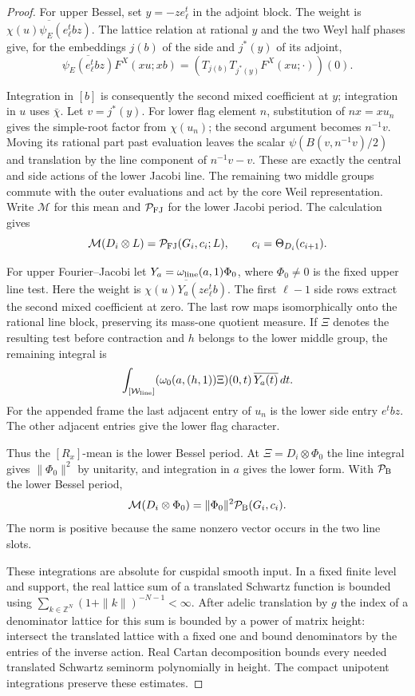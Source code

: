 \begin{proof}
For upper Bessel, set \(y=-ze_\ell^t\) in the adjoint block.
The weight is \(\overline{\chi(u)\psi_E(e_\ell^t b z)}\).
The lattice relation at rational \(y\) and the two Weyl half phases
give, for the embeddings \(j(b)\) of the side and \(j^*(y)\) of
its adjoint,
\[
 \overline{\psi_E(e_\ell^t b z)}F^X(xu;xb)
      =(T_{j(b)}T_{j^*(y)}F^X(xu;\cdot))(0).
\]

Integration in \([b]\) is consequently the second mixed coefficient
at \(y\); integration in \(u\) uses \(\bar\chi\). Let \(v=j^*(y)\).
For lower flag element \(n\), substitution of \(nx=xu_n\) gives
the simple-root factor from \(\chi(u_n)\); the second argument becomes
\(n^{-1}v\). Moving its rational part past evaluation leaves the
scalar \(\psi(B(v,n^{-1}v)/2)\) and translation by the line component
of \(n^{-1}v-v\). These are exactly the central and side actions
of the lower Jacobi line. The remaining two middle groups commute
with the outer evaluations and act by the core Weil representation.
Write \(\mathcal M\) for this mean and \(\mathcal P_{\rm FJ}\) for the lower Jacobi period. The calculation gives
\[
 \mathcal M(D_i\otimes L)=\mathcal P_{\rm FJ}(G_i,c_i;L),\qquad c_i=\Theta_{D_i}(c_{i+1}).
\]



For upper Fourier--Jacobi let \(Y_a=\omega_{\rm line}(a,1)\Phi_0\),
where \(\Phi_0\ne0\) is the fixed upper line test. Here the weight
is \(\overline{\chi(u)Y_a(ze_\ell^t b)}\). The first \(\ell-1\)
side rows extract the second mixed coefficient at zero. The last
row maps isomorphically onto the rational line block, preserving
its mass-one quotient measure. If \(\Xi\) denotes the resulting
test before contraction and \(h\) belongs to the lower middle group,
the remaining integral is
\[
 \int_{[\mathcal W_{\rm line}]}
     (\omega_0(a,(h,1))\Xi)(0,t)\,\overline{Y_a(t)}\,dt .
\]
For the appended frame the last adjacent entry of \(u_n\) is the
lower side entry \(e^t b z\). The other adjacent entries give the
lower flag character.

Thus the \([R_x]\)-mean is the lower Bessel
period. At \(\Xi=D_i\otimes\Phi_0\) the line integral gives
\(\|\Phi_0\|^2\) by unitarity, and integration in \(a\) gives the lower form. With \(\mathcal P_{\rm B}\) the lower Bessel period,
\[
 \mathcal M(D_i\otimes\Phi_0)=\|\Phi_0\|^2\mathcal P_{\rm B}(G_i,c_i).
\]
The norm is positive because the same nonzero vector occurs in the two line slots.

These integrations are absolute for cuspidal smooth input. In a
fixed finite level and support, the real lattice sum of a translated
Schwartz function is bounded using
\(\sum_{k\in\mathbb Z^N}(1+\|k\|)^{-N-1}<\infty\).
After adelic translation by \(g\) the index of a denominator lattice
for this sum is bounded by a power of matrix height: intersect the
translated lattice with a fixed one and bound denominators by the
entries of the inverse action. Real Cartan decomposition bounds
every needed translated Schwartz seminorm polynomially in height.
The compact unipotent integrations preserve these estimates.


\end{proof}
